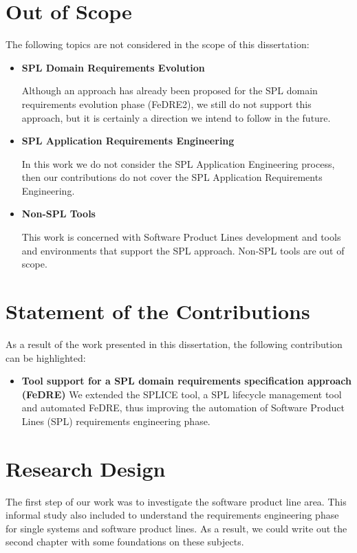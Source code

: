 \section{Out of Scope}
\label{sc:outofscope}
The following topics are not considered in the scope of this dissertation: 
\begin{itemize}
\item \textbf{SPL Domain Requirements Evolution}

Although an approach has already been proposed for the SPL domain requirements
evolution phase (FeDRE2), we still do not support this approach, but it is certainly a 
direction we intend to follow in the future.
\item \textbf{SPL Application Requirements Engineering}

In this work we do not consider the SPL Application Engineering process, then our contributions do 
not cover  the \ac{SPL} Application Requirements Engineering.
\item \textbf{Non-SPL Tools}

This work is concerned with Software Product Lines development and tools and
environments that support the \ac{SPL} approach. Non-SPL tools are out of scope.
\end{itemize}

\section{Statement of the Contributions}
\label{sc:contributions}
As a result of the work presented in this dissertation, the following contribution can be highlighted:
\begin{itemize}
\item \textbf{Tool support for a SPL domain requirements specification approach
(FeDRE)} 
We extended the \ac{SPLICE} tool, a \ac{SPL} lifecycle management tool
and automated \acf{FeDRE}, thus improving the automation of Software Product Lines (\ac{SPL}) requirements engineering phase.
\end{itemize}

\section{Research Design}
\label{sc:design}

The first step of our work was to investigate the software product line area. This informal 
study also included to understand the requirements engineering phase for single systems and 
software product lines. As a result, we could write out the second chapter with some foundations 
on these subjects.
 
